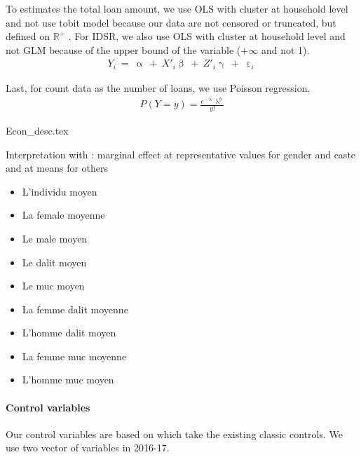 \documentclass[a4paper, 11pt, onecolumn]{article}
\begin{document}
To estimates the total loan amount, we use OLS with cluster at household level and not use tobit model because our data are not censored or truncated, but defined on $\mathbb{R}^{+}$ \citep{Maddala1991}.
For IDSR, we also use OLS with cluster at household level and not GLM because of the upper bound of the variable ($+\infty$ and not 1).
\begin{equation}\label{eq:ols}
\begin{split}
Y_{i}~=~\upalpha~+~X'_i\upbeta~+~Z'_{i}\upgamma~+~\upepsilon_i
\end{split}
\end{equation}


Last, for count data as the number of loans, we use Poisson regression.
\begin{equation}\label{eq:poisson}
\begin{split}
P(Y=y)=\frac{e^{-\uplambda}\uplambda^{y}}{y!}
\end{split}
\end{equation}







{Econ_desc.tex}

Interpretation with \cite{Williams2012} : marginal effect at representative values for gender and caste and at means for others
\begin{itemize}
\item L'individu moyen
\item La female moyenne
\item Le male moyen
\item Le dalit moyen
\item Le muc moyen
\item La femme dalit moyenne
\item L'homme dalit moyen
\item La femme muc moyenne
\item L'homme muc moyen
\end{itemize}

\paragraph{Control variables}
Our control variables are based on \cite{Reboul2021, Brown2014, Chichaibelu2017} which take the existing classic controls. 
We use two vector of variables in 2016-17.
\end{document}
